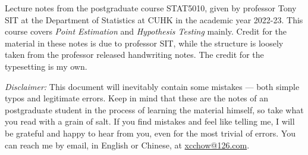 Lecture notes from the postgraduate course STAT5010, given by professor
Tony SIT at the Department of Statistics at CUHK in the academic year 2022-23. This
course covers \textit{Point Estimation} and \textit{Hypothesis Testing} mainly. 
Credit for the material in these notes is due to professor
SIT, while the structure is loosely taken from the professor released handwriting notes. 
The credit for the typesetting is my own.

\textit{Disclaimer:} This document will inevitably contain some mistakes — both
simple typos and legitimate errors. Keep in mind that these are the notes of an
postgraduate student in the process of learning the material himself, so take
what you read with a grain of salt. If you find mistakes and feel like telling
me, I will be grateful and happy to hear from you, even for the most trivial of
errors. You can reach me by email, in English or Chinese, at
\href{mailto:xcchow@126.com}{xcchow@126.com}.